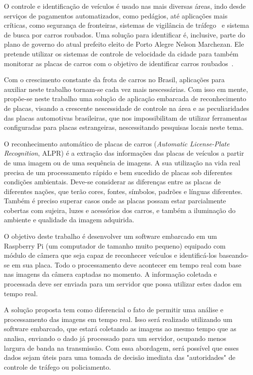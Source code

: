O controle e identificação de veículos é usado nas mais diversas áreas, indo
desde serviços de pagamentos automatizados, como pedágios, até aplicações mais
críticas, como segurança de fronteiras, sistemas de vigilância de
tráfego~\cite{ahmad2015automatic} e sistema de busca por carros roubados.
Uma solução para identificar é, inclusive,  parte do plano de governo do atual prefeito eleito de Porto Alegre
Nelson Marchezan. Ele pretende utilizar os sistemas de controle de velocidade da cidade para também
monitorar as placas de carros com o objetivo de identificar carros roubados~\cite{psdb2016marchezan}.

Com o crescimento constante da frota de carros no Brasil, aplicações para
auxiliar neste trabalho tornam-se cada vez
mais nescessárias. Com isso em mente, propõe-se neste trabalho uma solução de
aplicação embarcada de reconhecimento de placas, visando a
crescente nescessidade de controle na área e as peculiaridades das placas
automotivas brasileiras, que nos impossibilitam de utilizar ferramentas
configuradas para placas estrangeiras, nescessitando pesquisas locais neste
tema.

O reconhecimento automático de placas de carros (\emph{Automatic License-Plate
Recognition}, ALPR) é a extração das informações das placas de veículos a partir
de uma imagem ou de uma sequência de imagens. A sua utilização na vida real
precisa de um processamento rápido e bem sucedido de placas sob diferentes
condições ambientais. Deve-se considerar as diferenças entre as placas de
diferentes nações, que terão cores, fontes, símbolos, padrões e línguas
diferentes. Também é preciso superar casos onde as placas possam estar
parcialmente cobertas com sujeira, luzes e acessórios dos
carros, e também a iluminação do ambiente e qualidade
da imagem adquirida.~\cite{s2013automatic}

O objetivo deste trabalho é desenvolver um software embarcado em um Raspberry Pi
(um computador de tamanho muito pequeno) equipado com módulo de câmera que seja
capaz de reconhecer veículos e identificá-los baseando-se em sua
placa. Todo o processamento deve acontecer em tempo real com base nas imagens da
câmera captadas no momento. A informação coletada e processada deve ser enviada
para um servidor que possa utilizar estes dados em tempo real.

A solução proposta tem como diferencial o fato de permitir uma
análise e processamento das imagens em tempo real. Isso será realizado
utilizando um software embarcado, que estará coletando as imagens ao mesmo tempo
que as analisa, enviando o dado já processado para um servidor, ocupando menos
largura de banda na transmissão. Com essa abordagem, será possível que esses
dados sejam úteis para uma tomada de decisão imediata das "autoridades" de
controle de tráfego ou policiamento.

